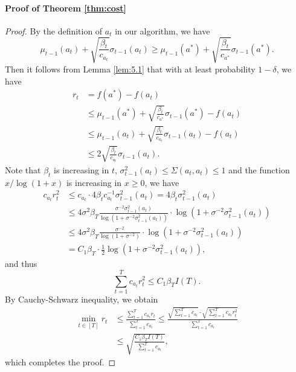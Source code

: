 \documentclass[letterpaper]{vldb}
\begin{document}
\paragraph*{Proof of Theorem \ref{thm:cost}}
\begin{proof}
  By the definition of $a_t$ in our algorithm, we have
  \[
    \mu_{t-1}(a_t) + \sqrt{\frac{\beta_t}{c_{a_t}}}\sigma_{t-1}(a_t) \ge
    \mu_{t-1}(a^\ast) + \sqrt{\frac{\beta_t}{c_{a^\ast}}}\sigma_{t-1}(a^\ast).
  \]
  Then it follows from Lemma \ref{lem:5.1} that with at least probability
  $1-\delta$, we have
  \begin{align*}
    r_t & = f(a^\ast) - f(a_t)\\
        & \le \mu_{t-1}(a^\ast) + \sqrt{\frac{\beta_t}{c_{a^\ast}}}\sigma_{t-1}(a^\ast) - f(a_t)\\
        & \le \mu_{t-1}(a_t) + \sqrt{\frac{\beta_t}{c_{a_t}}}\sigma_{t-1}(a_t) - f(a_t)\\
    & \le 2 \sqrt{\frac{\beta_t}{c_{a_t}}}\sigma_{t-1}(a_t).
  \end{align*}
  Note that $\beta_t$ is increasing in $t$, $\sigma_{t-1}^2(a_t) \le \Sigma(a_t,a_t)\le 1$ and the function
  $x/\log(1+x)$ is increasing in $x\ge0$, we have
  \begin{align*}
    c_{a_t} r_t^2 &\le c_{a_t} \cdot 4\beta_t c^{-1}_{a_t} \sigma_{t-1}^2(a_t) = 4\beta_t \sigma_{t-1}^2(a_t)\\
                  & \le 4\sigma^2 \beta_T \frac{\sigma^{-2}\sigma^2_{t-1}(a_t)}{\log(1+\sigma^{-2}\sigma^2_{t-1}(a_t))}\cdot \log(1+\sigma^{-2}\sigma^2_{t-1}(a_t))\\
                  & \le 4\sigma^2 \beta_T \frac{\sigma^{-2}}{\log(1 + \sigma^{-2})}\cdot \log(1+\sigma^{-2}\sigma^2_{t-1}(a_t))\\
                  & = C_1 \beta_T\cdot \frac{1}{2}\log(1+\sigma^{-2}\sigma^2_{t-1}(a_t)),
  \end{align*}
  and thus
  \[
    \sum_{t=1}^Tc_{a_t} r_t^2 \le C_1\beta_T I(T).
  \]
  By Cauchy-Schwarz inequality, we obtain
  \begin{align*}
    \min_{t\in [T]}r_t & 
                         \le \frac{\sum_{t=1}^Tc_{a_t}r_t}{\sum_{t=1}^Tc_{a_t}}\le \frac{\sqrt{\sum_{t=1}^Tc_{a_t}}\cdot \sqrt{\sum_{t=1}^Tc_{a_t} r_t^2}}{\sum_{t=1}^Tc_{a_t}}\\
& \le \sqrt{\frac{C_1\beta_T I(T)}{\sum_{t=1}^T c_{a_t}}},
  \end{align*}
which completes the proof.
\end{proof}
\end{document}
